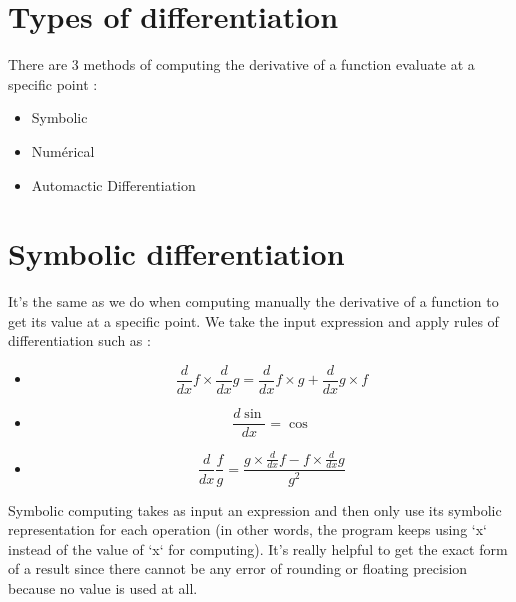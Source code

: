 \documentclass[12pt]{article}
\begin{document}
\thispagestyle{empty}
\noindent{}
\justify

\tableofcontents


%
%


\section*{Types of differentiation}

There are 3 methods of computing the derivative of a function evaluate at a specific point :

\begin{itemize}
\item Symbolic
\item Numérical
\item Automactic Differentiation
\end{itemize}


%
%

\section{Symbolic differentiation}


It's the same as we do when computing manually the derivative of a function to get its value at a specific point. We take the input expression and apply rules of differentiation such as :

\begin{itemize}
\item $$ \frac{d}{dx}f \times \frac{d}{dx}g = \frac{d}{dx}f \times g + \frac{d}{dx}g \times f $$
\item $$ \frac{d\sin}{dx} = \cos $$
\item $$\frac{d}{dx}\frac{f}{g} = \frac{ g \times \frac{d}{dx}f - f \times \frac{d}{dx}g }{g^2}$$
\end{itemize}

Symbolic computing takes as input an expression and then only use its symbolic representation for each operation (in other words, the program keeps using `x` instead of the value of `x` for computing). It's really helpful to get the exact form of a result since there cannot be any error of rounding or floating precision because no value is used at all.
\end{document}
